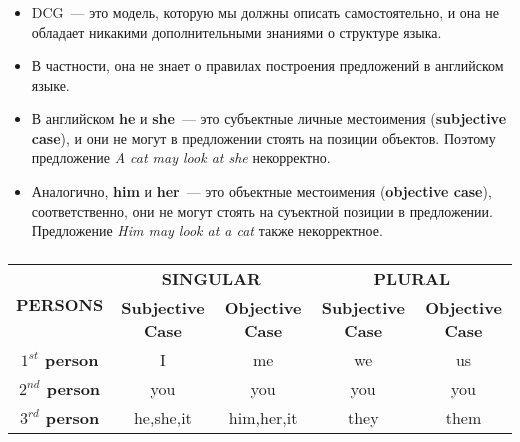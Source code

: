 \begin{frame}

	\frametitle{\insertsection}
	\framesubtitle{\insertsubsection}
	
	\begin{itemize}
		\item DCG~--- это модель, которую мы должны описать самостоятельно, и она не обладает никакими дополнительными знаниями о структуре языка.
		\item В частности, она не знает о правилах построения предложений в английском языке.
		\item В английском \textbf{he} и \textbf{she}~--- это субъектные личные местоимения (\textbf{subjective case}), и они не могут в предложении стоять на
		позиции объектов. Поэтому предложение \textit{A cat may look at she} некорректно.
		\item Аналогично, \textbf{him} и \textbf{her}~--- это объектные местоимения (\textbf{objective case}), соответственно, они не могут стоять на
		суъектной позиции в предложении. Предложение \textit{Him may look at a cat} также некорректное.
	\end{itemize}

\end{frame}


\begin{frame}

	\frametitle{\insertsection}
	\framesubtitle{\insertsubsection}
	
	\begin{table}
		\centering
		\begin{tabular}{| c | c | c | c | c |}
			\hline
			\multirow{2}{*}{\textbf{PERSONS}} & \multicolumn{2}{|c|}{\textbf{SINGULAR}} & \multicolumn{2}{|c|}{\textbf{PLURAL}} \\ \cline{2-5}
			& \textbf{Subjective Case} & \textbf{Objective Case} & \textbf{Subjective Case} & \textbf{Objective Case} \\
			\hline
			\textbf{\(1^{st}\) person} & I & me & we & us \\
			\hline
			\textbf{\(2^{nd}\) person} & you & you & you & you \\
			\hline
			\textbf{\(3^{rd}\) person} & he,she,it & him,her,it & they & them \\
			\hline
		\end{tabular}
	\end{table}

\end{frame}


